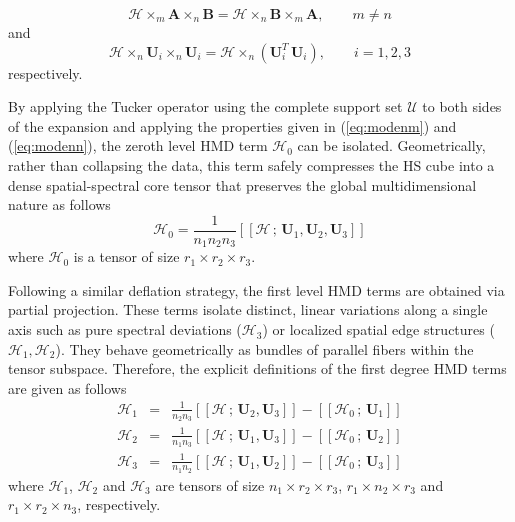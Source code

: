 \documentclass[12pt,onecolumn]{article}
\newcommand{\kruskal}[1]{\left[\!\left[#1\right]\!\right]}
\begin{document}
\begin{equation}
\label{eq:modenm}
\mathcal{H}\times_m \mathbf{A}\times_n \mathbf{B} = \mathcal{H}\times_n \mathbf{B}\times_m
\mathbf{A},\qquad m\neq n
\end{equation}
and
\begin{equation}
\label{eq:modenn}
\mathcal{H}\times_n \mathbf{U}_i\times_n \mathbf{U}_i = \mathcal{H}\times_n \left(\mathbf{U}_i^T\,\mathbf{U}_i\right),\qquad i=1,2,3
\end{equation}
respectively.

By applying the Tucker operator using the complete support set $\mathcal{U}$ to both sides of the expansion and applying the properties given in (\ref{eq:modenm}) and (\ref{eq:modenn}), the zeroth level HMD term $\mathcal{H}_0$ can be isolated. Geometrically, rather than collapsing the data, this term safely compresses the HS cube into a dense spatial-spectral core tensor that preserves the global multidimensional nature as follows
\begin{equation}
\label{eq:X0}
\mathcal{H}_0 = \frac{1}{n_1n_2n_3} \kruskal{ \mathcal{H}\,;\, \mathbf{U}_1,\mathbf{U}_2,\mathbf{U}_3 }
\end{equation}
where $\mathcal{H}_0$ is a tensor of size $r_1\times r_2\times r_3$. 

Following a similar deflation strategy, the first level HMD terms are obtained via partial projection. These terms isolate distinct, linear variations along a single axis such as pure spectral deviations ($\mathcal{H}_3$) or localized spatial edge structures ($\mathcal{H}_1, \mathcal{H}_2$). They behave geometrically as bundles of parallel fibers within the tensor subspace. Therefore, the explicit definitions of the first degree HMD terms are given as follows
\begin{eqnarray}
\label{eq:Xi}
\mathcal{H}_1 &=& \frac{1}{n_2n_3} \kruskal{ \mathcal{H}\,;\, \mathbf{U}_2, \mathbf{U}_3} - 
\kruskal{\mathcal{H}_0\,;\, \mathbf{U}_1} \nonumber \\
\mathcal{H}_2 &=& \frac{1}{n_1n_3} \kruskal{ \mathcal{H}\,;\, \mathbf{U}_1, \mathbf{U}_3} - 
\kruskal{\mathcal{H}_0\,;\, \mathbf{U}_2} 
\nonumber \\
\mathcal{H}_3 &=& \frac{1}{n_1n_2} \kruskal{ \mathcal{H}\,;\, \mathbf{U}_1, \mathbf{U}_2} - 
\kruskal{\mathcal{H}_0\,;\, \mathbf{U}_3}
\end{eqnarray}
where $\mathcal{H}_1$, $\mathcal{H}_2$ and $\mathcal{H}_3$ are tensors of size $n_1\times r_2\times r_3$, $r_1\times n_2\times r_3$ and $r_1\times r_2\times n_3$, respectively.
\end{document}
